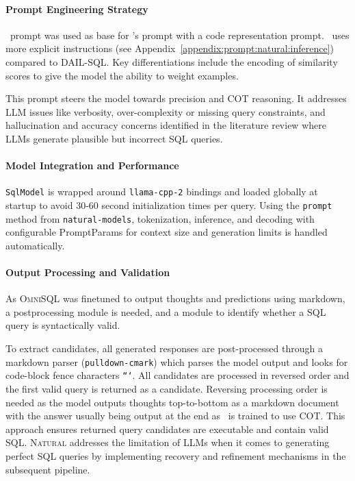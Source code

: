 \paragraph{Prompt Engineering Strategy}

\OmniSQL~prompt was used as base for \Natural's prompt with a code
representation prompt. \Natural~uses more explicit instructions (see
Appendix~\ref{appendix:prompt:natural:inference}) compared to DAIL-SQL. Key
differentiations include the encoding of similarity scores to give the model
the ability to weight examples.

This prompt steers the model towards precision and COT reasoning. It addresses
LLM issues like verbosity, over-complexity or missing query constraints, and
hallucination and accuracy concerns identified in the literature review where
LLMs generate plausible but incorrect SQL queries.

\paragraph{Model Integration and Performance}

\texttt{SqlModel} is wrapped around \texttt{llama-cpp-2} bindings and
loaded globally at startup to avoid 30-60 second initialization times per
query. Using the \texttt{prompt} method from \texttt{natural-models},
tokenization, inference, and decoding with configurable PromptParams for
context size and generation limits is handled automatically.

\paragraph{Output Processing and Validation}

As \textsc{OmniSQL} was finetuned to output thoughts and predictions using
markdown, a postprocessing module is needed, and a module to
identify whether a SQL query is syntactically valid.

To extract candidates, all generated responses are post-processed through a
markdown parser (\texttt{pulldown-cmark}) which parses the model output and
looks for code-block fence characters \texttt{```}. All candidates are
processed in reversed order and the first valid query is returned as a
candidate. Reversing processing order is needed as the model outputs thoughts
top-to-bottom as a markdown document with the answer usually being output at
the end as \OmniSQL~is trained to use COT. This approach ensures returned
query candidates are executable and contain valid SQL. \textsc{Natural}
addresses the limitation of LLMs when it comes to generating perfect SQL
queries by implementing recovery and refinement mechanisms in the subsequent
pipeline.

